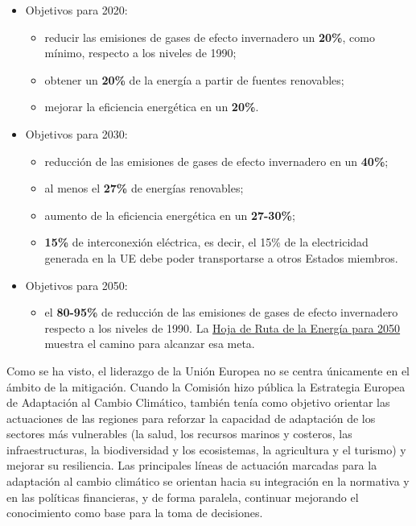 \begin{itemize}
\item
  Objetivos para 2020:

  \begin{itemize}
  \item
    reducir las emisiones de gases de efecto invernadero un
    \textbf{20\%}, como mínimo, respecto a los niveles de 1990;
  \item
    obtener un \textbf{20\%} de la energía a partir de fuentes
    renovables;
  \item
    mejorar la eficiencia energética en un \textbf{20\%}.
  \end{itemize}
\item
  Objetivos para 2030:

  \begin{itemize}
  \item
    reducción de las emisiones de gases de efecto invernadero en un
    \textbf{40\%};
  \item
    al menos el \textbf{27\%} de energías renovables;
  \item
    aumento de la eficiencia energética en un \textbf{27-30\%};
  \item
    \textbf{15\%} de interconexión eléctrica, es decir, el 15\% de la
    electricidad generada en la UE debe poder transportarse a otros
    Estados miembros.
  \end{itemize}
\item
  Objetivos para 2050:

  \begin{itemize}
  \item
    el \textbf{80-95\%} de reducción de las emisiones de gases de efecto
    invernadero respecto a los niveles de 1990. La
    \href{http://eur-lex.europa.eu/legal-content/ES/ALL/?uri=CELEX:52011DC0885}{Hoja
    de Ruta de la Energía para 2050} muestra el camino para alcanzar esa
    meta.
  \end{itemize}
\end{itemize}

Como se ha visto, el liderazgo de la Unión Europea no se centra
únicamente en el ámbito de la mitigación. Cuando la Comisión hizo
pública la Estrategia Europea de Adaptación al Cambio Climático, también
tenía como objetivo orientar las actuaciones de las regiones para
reforzar la capacidad de adaptación de los sectores más vulnerables (la
salud, los recursos marinos y costeros, las infraestructuras, la
biodiversidad y los ecosistemas, la agricultura y el turismo) y mejorar
su resiliencia. Las principales líneas de actuación marcadas para la
adaptación al cambio climático se orientan hacia su integración en la
normativa y en las políticas financieras, y de forma paralela, continuar
mejorando el conocimiento como base para la toma de decisiones.

